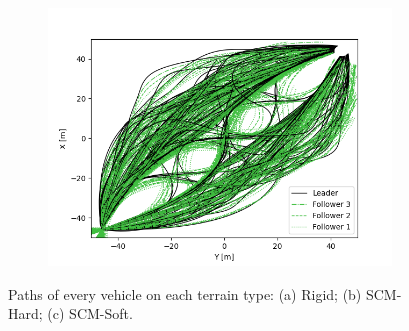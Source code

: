 \documentclass[12pt,twocolumn]{article}
\begin{document}
\begin{figure}
\begin{subfigure}{0.33\textwidth}
        \caption{} \label{fig:hard13pos}
    \end{subfigure}%
    \begin{subfigure}{0.33\textwidth}
        \includegraphics[width=\linewidth]{Figs/StatisticalAnalysis/1L_3F_soft_128_pos_v5.png}
        \caption{} \label{fig:soft13pos}
    \end{subfigure}%
    \caption{Paths of every vehicle on each terrain type: (a) Rigid; (b) SCM-Hard; (c) SCM-Soft.}   
    \label{fig:pathsranksall}
\end{figure}
\end{document}
